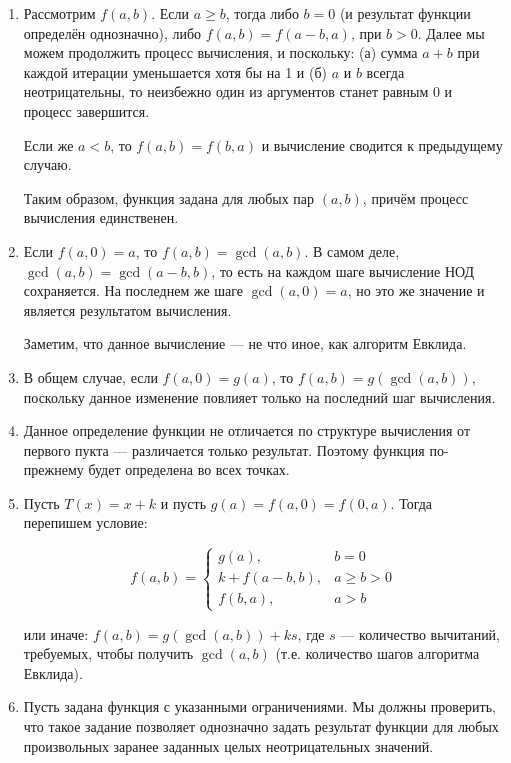 
\begin{enumerate}
\item Рассмотрим $f(a,b)$. Если $a \ge b$, тогда либо $b = 0$ (и результат функции определён однозначно),
либо $f(a,b) = f(a-b,a)$, при $b > 0$. Далее мы можем продолжить процесс вычисления, и поскольку:
(а) сумма $a+b$ при каждой итерации уменьшается хотя бы на 1 и (б) $a$ и $b$ всегда неотрицательны, 
то неизбежно один из аргументов станет равным $0$ и процесс завершится. 

Если же $a < b$, то $f(a,b) = f(b,a)$ и вычисление сводится к предыдущему случаю.

Таким образом, функция задана для любых пар $(a,b)$, причём процесс вычисления единственен.

\item Если $f(a,0) = a$, то $f(a,b) = \gcd(a,b)$.
В самом деле, $\gcd(a,b) = \gcd(a-b,b)$, то есть на каждом шаге вычисление НОД сохраняется.
На последнем же шаге $\gcd(a,0) = a$, но это же значение и является результатом вычисления.

Заметим, что данное вычисление --- не что иное, как алгоритм Евклида.

\item В общем случае, если $f(a,0) = g(a)$, то $f(a,b) = g(\gcd(a,b))$, поскольку данное 
изменение повлияет только на последний шаг вычисления.

\item Данное определение функции не отличается по структуре вычисления от первого пукта ---
различается только результат. Поэтому функция по-прежнему будет определена во всех точках.

\item Пусть $T(x) = x + k$ и пусть $g(a) = f(a,0) = f(0,a)$. Тогда перепишем условие:

$$f(a,b) = \left\{\begin{array}{ll}
   g(a), & b = 0\\
   k+f(a-b,b), & a \ge b > 0\\
   f(b,a), & a > b\end{array}\right.$$

или иначе: $f(a,b) = g(\gcd(a,b)) + ks$, где $s$ --- количество вычитаний, требуемых,
чтобы получить $\gcd(a,b)$ (т.е. количество шагов алгоритма Евклида). 

\item Пусть задана функция с указанными ограничениями. Мы должны проверить, что 
такое задание позволяет однозначно задать результат функции для любых произвольных
заранее заданных целых неотрицательных значений.


\end{enumerate}
